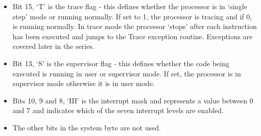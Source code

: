 \begin{itemize}[itemsep=0pt]

\item{}Bit 15, `T' is the trace flag -{} this defines whether the
            processor is in `single step' mode or running normally. If set to
            1, the processor is tracing and if 0, is running normally. In
            trace mode the processor `stops' after each instruction has been
            executed and jumps to the Trace exception routine. Exceptions are
            covered later in the series.


\item{}Bit 13, `S' is the supervisor flag -{} this defines whether
            the code being executed is running in user or supervisor mode. If
            set, the processor is in supervisor mode otherwise it is in user
            mode.


\item{}Bits 10, 9 and 8, `III' is the interrupt mask and represents
            a value between 0 and 7 and indicates which of the seven interrupt
            levels are enabled. 

\item{}The other bits in the system byte are not used.

\end{itemize}

